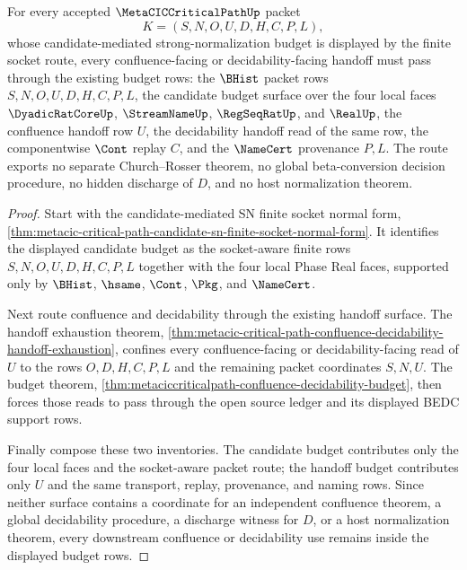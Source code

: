 \begin{theorem}
\label{thm:metacic-critical-path-sn-confluence-budget}
For every accepted $\MetaCICCriticalPathUp$ packet
$$
K=(S,N,O,U,D,H,C,P,L),
$$
whose candidate-mediated strong-normalization budget is displayed by the finite socket route, every confluence-facing or decidability-facing handoff must pass through the existing budget rows: the $\BHist$ packet rows $S,N,O,U,D,H,C,P,L$, the candidate budget surface over the four local faces $\DyadicRatCoreUp$, $\StreamNameUp$, $\RegSeqRatUp$, and $\RealUp$, the confluence handoff row $U$, the decidability handoff read of the same row, the componentwise $\Cont$ replay $C$, and the $\NameCert$ provenance $P,L$. The route exports no separate Church--Rosser theorem, no global beta-conversion decision procedure, no hidden discharge of $D$, and no host normalization theorem.
\end{theorem}
\begin{proof}
Start with the candidate-mediated SN finite socket normal form, \autoref{thm:metacic-critical-path-candidate-sn-finite-socket-normal-form}. It identifies the displayed candidate budget as the socket-aware finite rows $S,N,O,U,D,H,C,P,L$ together with the four local Phase Real faces, supported only by $\BHist$, $\hsame$, $\Cont$, $\Pkg$, and $\NameCert$.

Next route confluence and decidability through the existing handoff surface. The handoff exhaustion theorem, \autoref{thm:metacic-critical-path-confluence-decidability-handoff-exhaustion}, confines every confluence-facing or decidability-facing read of $U$ to the rows $O,D,H,C,P,L$ and the remaining packet coordinates $S,N,U$. The budget theorem, \autoref{thm:metaciccriticalpath-confluence-decidability-budget}, then forces those reads to pass through the open source ledger and its displayed BEDC support rows.

Finally compose these two inventories. The candidate budget contributes only the four local faces and the socket-aware packet route; the handoff budget contributes only $U$ and the same transport, replay, provenance, and naming rows. Since neither surface contains a coordinate for an independent confluence theorem, a global decidability procedure, a discharge witness for $D$, or a host normalization theorem, every downstream confluence or decidability use remains inside the displayed budget rows.
\end{proof}

